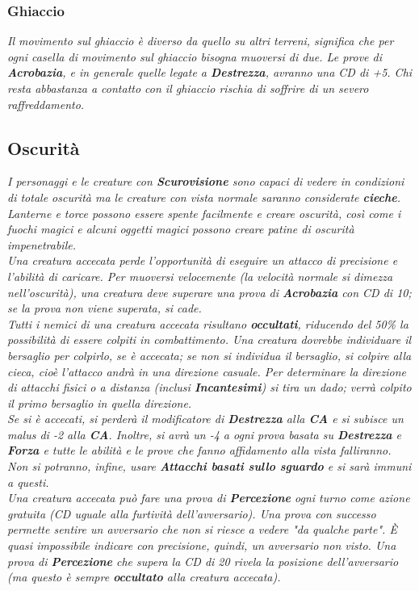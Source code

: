 				\subsubsection{Ghiaccio}
					\emph{Il movimento sul ghiaccio è diverso da quello su altri terreni, significa che per ogni casella di movimento sul ghiaccio bisogna muoversi di due. Le prove di \textbf{Acrobazia}, e in generale quelle legate a \textbf{Destrezza}, avranno una CD di +5. Chi resta abbastanza a contatto con il ghiaccio rischia di soffrire di un severo raffreddamento.}
	
		\subsection{Oscurità}
			\emph{I personaggi e le creature con \textbf{Scurovisione} sono capaci di vedere in condizioni di totale oscurità ma le creature con vista normale saranno considerate \textbf{cieche}. Lanterne e torce possono essere spente facilmente e creare oscurità, così come i fuochi magici e alcuni oggetti magici possono creare patine di oscurità impenetrabile.\\
			Una creatura accecata perde l'opportunità di eseguire un attacco di precisione e l'abilità di caricare. Per muoversi velocemente (la velocità normale si dimezza nell'oscurità), una creatura deve superare una prova di \textbf{Acrobazia} con CD di 10; se la prova non viene superata, si cade.\\
			Tutti i nemici di una creatura accecata risultano \textbf{occultati}, riducendo del 50\% la possibilità di essere colpiti in combattimento. Una creatura dovrebbe individuare il bersaglio per colpirlo, se è accecata; se non si individua il bersaglio, si colpire alla cieca, cioè l'attacco andrà in una direzione casuale. Per determinare la direzione di attacchi fisici o a distanza (inclusi \textbf{Incantesimi}) si tira un dado; verrà colpito il primo bersaglio in quella direzione.\\
			Se si è accecati, si perderà il modificatore di \textbf{Destrezza} alla \textbf{CA} e si subisce un malus di -2 alla \textbf{CA}. Inoltre, si avrà un -4 a ogni prova basata su \textbf{Destrezza} e \textbf{Forza} e tutte le abilità e le prove che fanno affidamento alla vista falliranno. Non si potranno, infine, usare \textbf{Attacchi basati sullo sguardo} e si sarà immuni a questi.\\
			Una creatura accecata può fare una prova di \textbf{Percezione} ogni turno come azione gratuita (CD uguale alla furtività dell'avversario). Una prova con successo permette sentire un avversario che non si riesce a vedere "da qualche parte". È quasi impossibile indicare con precisione, quindi, un avversario non visto. Una prova di \textbf{Percezione} che supera la CD di 20 rivela la posizione dell'avversario (ma questo è sempre \textbf{occultato} alla creatura accecata).\\
}
